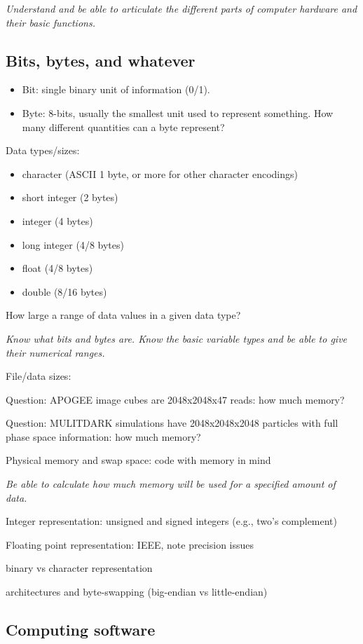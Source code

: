 \documentclass{article}
\newcommand{\test}[1]{%
    \begin{center}
        \colorbox{hl}{\parbox{0.9\textwidth}{\emph{#1}}}
    \end{center}}
\begin{document}
\test{Understand and be able to articulate the different parts of computer
hardware and their basic functions.}

\subsection{Bits, bytes, and whatever}
\begin{itemize}
    \item Bit: single binary unit of information (0/1).
    \item Byte: 8-bits, usually the smallest unit used to represent
        something. How many different quantities can a byte represent?
\end{itemize}
Data types/sizes:
\begin{itemize}
    \item character (ASCII 1 byte, or more for other character encodings)
    \item short integer (2 bytes)
    \item integer (4 bytes)
    \item long integer (4/8 bytes)
    \item float (4/8 bytes)
    \item double (8/16 bytes)
\end{itemize}

How large a range of data values in a given data type?

\test{Know what bits and bytes are. Know the basic variable types and be
able to give their numerical ranges.}

File/data sizes:

Question: APOGEE image cubes are 2048x2048x47 reads: how much memory?

Question: MULITDARK simulations have 2048x2048x2048 particles with
full phase space information: how much memory?

Physical memory and swap space: code with memory in mind

\test{Be able to calculate how much memory will be used for a
specified amount of data.}

Integer representation: unsigned and signed integers (e.g., two's
complement)

Floating point representation: IEEE, note precision issues

binary vs character representation

architectures and byte-swapping (big-endian vs little-endian)

\subsection{Computing software}
\end{document}
